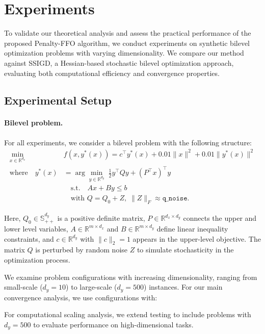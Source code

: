 \documentclass[letterpaper]{article} %
\newcommand{\1}{\mathbf{1}}
\begin{document}
\section{Experiments}
To validate our theoretical analysis and assess the practical performance of the proposed Penalty-FFO algorithm, we conduct experiments on synthetic bilevel optimization problems with varying dimensionality. We compare our method against SSIGD, a Hessian-based stochastic bilevel optimization approach, evaluating both computational efficiency and convergence properties.

\subsection{Experimental Setup}
\paragraph{Bilevel problem.}
For all experiments, we consider a bilevel problem with the following structure:
\begin{equation}
\boxed{
\begin{aligned}
\min_{x \in \mathbb{R}^{d_x}} \quad & f(x, y^*(x)) = c^\top y^*(x) + 0.01 \|x\|^2 + 0.01 \|y^*(x)\|^2 \\
\text{where} \quad y^*(x) &= \arg\min_{y \in \mathbb{R}^{d_y}} \;
\tfrac{1}{2} y^\top Q y + (P^\top x)^\top y \\
&\quad \text{s.t.} \quad A x + B y \leq b \\
&\quad \text{with } Q = Q_0 + Z,\; \|Z\|_F \approx \texttt{q\_noise}.
\end{aligned}
}
\end{equation}

Here, $Q_0 \in \mathbb{S}_{++}^{d_y}$ is a positive definite matrix, $P \in \mathbb{R}^{d_x \times d_y}$ connects the upper and lower level variables, $A \in \mathbb{R}^{m \times d_x}$ and $B \in \mathbb{R}^{m \times d_y}$ define linear inequality constraints, and $c \in \mathbb{R}^{d_y}$ with $\|c\|_2 = 1$ appears in the upper-level objective. The matrix $Q$ is perturbed by random noise $Z$ to simulate stochasticity in the optimization process.

We examine problem configurations with increasing dimensionality, ranging from small-scale ($d_y = 10$) to large-scale ($d_y = 500$) instances. For our main convergence analysis, we use configurations with:

For computational scaling analysis, we extend testing to include problems with $d_y = 500$ to evaluate performance on high-dimensional tasks.
\end{document}
